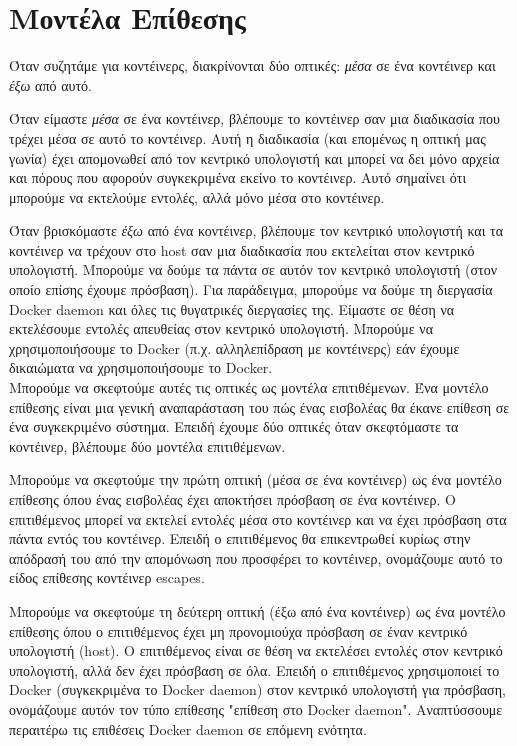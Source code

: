 \chapter{Μοντέλα Επίθεσης}
\label{attackModes}

Όταν συζητάμε για κοντέινερς, διακρίνονται δύο οπτικές: 
\emph{μέσα} σε ένα κοντέινερ και \emph{έξω} από αυτό.

Όταν είμαστε \emph{μέσα} σε ένα κοντέινερ, βλέπουμε το κοντέινερ σαν μια
διαδικασία που τρέχει μέσα σε αυτό το κοντέινερ. Αυτή η διαδικασία (και
επομένως η οπτική μας γωνία) έχει απομονωθεί από τον κεντρικό υπολογιστή και μπορεί να
δει μόνο αρχεία και πόρους που αφορούν συγκεκριμένα εκείνο το κοντέινερ. Αυτό
σημαίνει ότι μπορούμε να εκτελούμε εντολές, αλλά μόνο μέσα στο κοντέινερ.

Όταν βρισκόμαστε \emph{έξω} από ένα κοντέινερ, βλέπουμε τον κεντρικό υπολογιστή
και τα κοντέινερ να τρέχουν στο \textlatin{host} σαν μια διαδικασία που
εκτελείται στον κεντρικό υπολογιστή. Μπορούμε να δούμε τα πάντα σε αυτόν τον
κεντρικό υπολογιστή (στον οποίο επίσης έχουμε πρόσβαση). Για παράδειγμα,
μπορούμε να δούμε τη διεργασία \textlatin{Docker daemon} και όλες τις θυγατρικές
διεργασίες της. Είμαστε σε θέση να εκτελέσουμε εντολές απευθείας στον κεντρικό
υπολογιστή. Μπορούμε να χρησιμοποιήσουμε το \textlatin{Docker} (π.χ.
αλληλεπίδραση με κοντέινερς) εάν έχουμε δικαιώματα να χρησιμοποιήσουμε το
\textlatin{Docker}. \\

Μπορούμε να σκεφτούμε αυτές τις οπτικές ως μοντέλα επιτιθέμενων. Ένα μοντέλο
επίθεσης είναι μια γενική αναπαράσταση του πώς ένας εισβολέας θα έκανε επίθεση
σε ένα συγκεκριμένο σύστημα. Επειδή έχουμε δύο οπτικές όταν σκεφτόμαστε τα
κοντέινερ, βλέπουμε δύο μοντέλα επιτιθέμενων.

Μπορούμε να σκεφτούμε την πρώτη οπτική (μέσα σε ένα κοντέινερ) ως ένα μοντέλο
επίθεσης όπου ένας εισβολέας έχει αποκτήσει πρόσβαση σε ένα κοντέινερ.
Ο επιτιθέμενος μπορεί να εκτελεί εντολές μέσα στο κοντέινερ και να έχει
πρόσβαση στα πάντα εντός του κοντέινερ. Επειδή ο επιτιθέμενος θα επικεντρωθεί
κυρίως στην απόδρασή του από την απομόνωση που προσφέρει το κοντέινερ,
ονομάζουμε αυτό το είδος επίθεσης κοντέινερ \textlatin{escapes}.

Μπορούμε να σκεφτούμε τη δεύτερη οπτική (έξω από ένα κοντέινερ) ως ένα
μοντέλο επίθεσης όπου ο επιτιθέμενος έχει μη προνομιούχα πρόσβαση σε έναν
κεντρικό υπολογιστή (\textlatin{host}). Ο επιτιθέμενος είναι σε θέση να
εκτελέσει εντολές στον κεντρικό υπολογιστή, αλλά δεν έχει πρόσβαση
σε όλα. Επειδή ο επιτιθέμενος χρησιμοποιεί το \textlatin{Docker} (συγκεκριμένα
το \textlatin{Docker daemon}) στον κεντρικό υπολογιστή για πρόσβαση,
ονομάζουμε αυτόν τον τύπο επίθεσης "επίθεση στο \textlatin{Docker daemon}".
Αναπτύσσουμε περαιτέρω τις επιθέσεις \textlatin{Docker daemon} σε επόμενη ενότητα.

